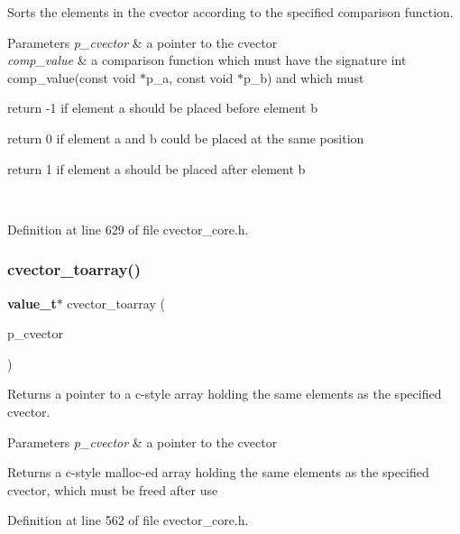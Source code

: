 Sorts the elements in the cvector according to the specified comparison function. 
\begin{DoxyParams}{Parameters}
{\em p\+\_\+cvector} & a pointer to the cvector \\
\hline
{\em comp\+\_\+value} & a comparison function which must have the signature int comp\+\_\+value(const void $\ast$p\+\_\+a, const void $\ast$p\+\_\+b) and which must
\begin{DoxyItemize}
\item return -\/1 if element a should be placed before element b
\item return 0 if element a and b could be placed at the same position
\item return 1 if element a should be placed after element b 
\end{DoxyItemize}\\
\hline
\end{DoxyParams}


Definition at line 629 of file cvector\+\_\+core.\+h.

\mbox{\label{cvector__core_8h_acee2f57054d93a57da2b95f95df8fda8}} 
\subsubsection{cvector\+\_\+toarray()}
{\footnotesize\ttfamily \textbf{ value\+\_\+t}$\ast$ cvector\+\_\+toarray (\begin{DoxyParamCaption}\item[{\textbf{ cvector} $\ast$}]{p\+\_\+cvector }\end{DoxyParamCaption})}

Returns a pointer to a c-\/style array holding the same elements as the specified cvector. 
\begin{DoxyParams}{Parameters}
{\em p\+\_\+cvector} & a pointer to the cvector \\
\hline
\end{DoxyParams}
\begin{DoxyReturn}{Returns}
a c-\/style malloc-\/ed array holding the same elements as the specified cvector, which must be freed after use 
\end{DoxyReturn}


Definition at line 562 of file cvector\+\_\+core.\+h.

